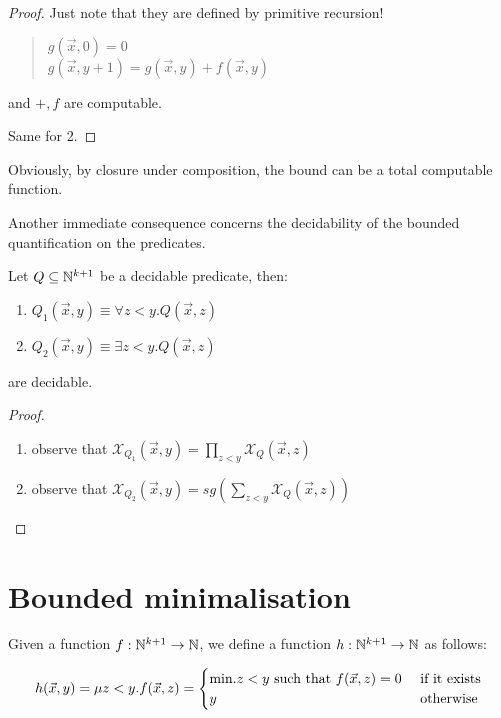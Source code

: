 \begin{proof}
  Just note that they are defined by primitive recursion!

  \begin{quote}
    $g(\vec{x},0) = 0$\\
    $g(\vec{x},y+1) = g(\vec{x},y) + f(\vec{x},y)$
  \end{quote}
  
  and $+,f$ are computable.

  Same for 2.
\end{proof}

Obviously, by closure under composition, the bound can be a total computable function.

Another immediate consequence concerns the decidability of the bounded quantification on the predicates.

\begin{lemma}
  Let $Q\subseteq \mathbb{N}^{k+1}$ be a decidable predicate, then:
  \begin{enumerate}
  \item $Q_1(\vec{x},y) \equiv \forall z<y. Q(\vec{x},z)$
  \item $Q_2(\vec{x},y) \equiv \exists z<y. Q(\vec{x},z)$
  \end{enumerate}  
  are decidable.
\end{lemma}

\begin{proof}
  \begin{enumerate}
  \item observe that $\mathcal{X}_{Q_1}(\vec{x},y) = \prod_{z<y}\mathcal{X}_Q(\vec{x},z)$
  \item observe that $\mathcal{X}_{Q_2}(\vec{x},y) = sg(\sum_{z<y}\mathcal{X}_Q(\vec{x},z))$
  \end{enumerate}
\end{proof}

\section{Bounded minimalisation}
Given a function $f: \mathbb{N}^{k+1} \rightarrow \mathbb{N}$, we define a function $h: \mathbb{N}^{k+1} \rightarrow \mathbb{N}$ as follows:

\begin{equation*}
  h(\vec{x},y) = \mu z<y . f(\vec{x},z) =
  \begin{cases}
    $min.$z<y$ such that $ f(\vec{x},z) = 0 & $ if it exists$ \\
    y                                   & $ otherwise $
  \end{cases}
\end{equation*}

